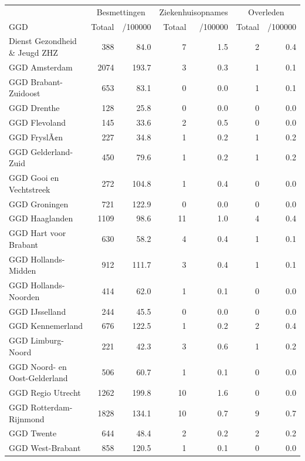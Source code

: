 \documentclass[
  english,
  man,floatsintext]{apa6}
\begin{document}
\begin{table}
\centering\begingroup\fontsize{10}{12}\selectfont

\begin{threeparttable}
\begin{tabular}{lrrrrrr}
\toprule
\multicolumn{1}{c}{ } & \multicolumn{2}{c}{Besmettingen} & \multicolumn{2}{c}{Ziekenhuisopnames} & \multicolumn{2}{c}{Overleden} \\
\cmidrule(l{3pt}r{3pt}){2-3} \cmidrule(l{3pt}r{3pt}){4-5} \cmidrule(l{3pt}r{3pt}){6-7}
GGD & Totaal & /100000 & Totaal & /100000 & Totaal & /100000\\
\midrule
Dienst Gezondheid \& Jeugd ZHZ & 388 & 84.0 & 7 & 1.5 & 2 & 0.4\\
GGD Amsterdam & 2074 & 193.7 & 3 & 0.3 & 1 & 0.1\\
GGD Brabant-Zuidoost & 653 & 83.1 & 0 & 0.0 & 1 & 0.1\\
GGD Drenthe & 128 & 25.8 & 0 & 0.0 & 0 & 0.0\\
GGD Flevoland & 145 & 33.6 & 2 & 0.5 & 0 & 0.0\\
GGD FryslÃ¢n & 227 & 34.8 & 1 & 0.2 & 1 & 0.2\\
GGD Gelderland-Zuid & 450 & 79.6 & 1 & 0.2 & 1 & 0.2\\
GGD Gooi en Vechtstreek & 272 & 104.8 & 1 & 0.4 & 0 & 0.0\\
GGD Groningen & 721 & 122.9 & 0 & 0.0 & 0 & 0.0\\
GGD Haaglanden & 1109 & 98.6 & 11 & 1.0 & 4 & 0.4\\
GGD Hart voor Brabant & 630 & 58.2 & 4 & 0.4 & 1 & 0.1\\
GGD Hollands-Midden & 912 & 111.7 & 3 & 0.4 & 1 & 0.1\\
GGD Hollands-Noorden & 414 & 62.0 & 1 & 0.1 & 0 & 0.0\\
GGD IJsselland & 244 & 45.5 & 0 & 0.0 & 0 & 0.0\\
GGD Kennemerland & 676 & 122.5 & 1 & 0.2 & 2 & 0.4\\
GGD Limburg-Noord & 221 & 42.3 & 3 & 0.6 & 1 & 0.2\\
GGD Noord- en Oost-Gelderland & 506 & 60.7 & 1 & 0.1 & 0 & 0.0\\
GGD Regio Utrecht & 1262 & 199.8 & 10 & 1.6 & 0 & 0.0\\
GGD Rotterdam-Rijnmond & 1828 & 134.1 & 10 & 0.7 & 9 & 0.7\\
GGD Twente & 644 & 48.4 & 2 & 0.2 & 2 & 0.2\\
GGD West-Brabant & 858 & 120.5 & 1 & 0.1 & 0 & 0.0\\

\end{tabular}
\end{threeparttable}
\end{table}
\end{document}
